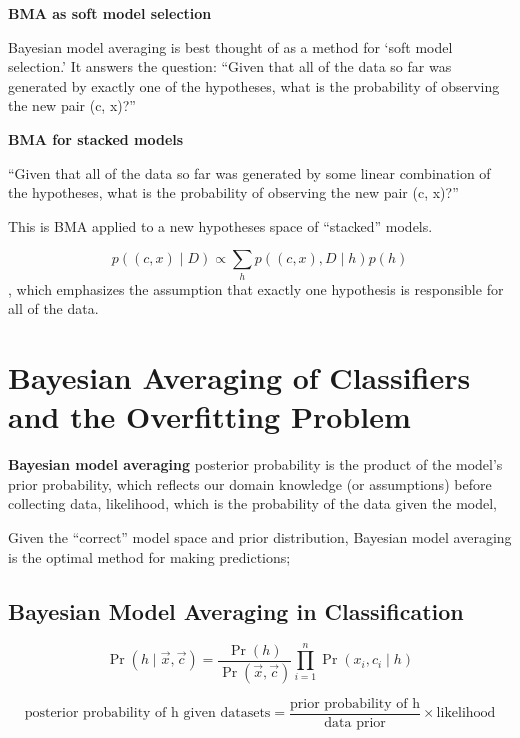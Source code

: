 \documentclass{article}
\begin{document}
\textbf{BMA as soft model selection}

Bayesian model averaging is best thought of as a method for ‘soft model selection.’ It answers the question: “Given that all of the data so far was generated by exactly one of the hypotheses, what is the probability of observing the new pair (c, x)?”

\textbf{BMA for stacked models}

“Given that all of the data so far was generated by some linear combination of the hypotheses, what is the probability of observing the new pair (c, x)?”

This is BMA applied to a new hypotheses space of “stacked” models. 

\begin{equation}
    p((c, x) \mid D) \propto \sum_{h} p((c, x), D \mid h) p(h)
\end{equation},
which emphasizes the assumption that exactly one hypothesis is responsible for all of the data.

\section{Bayesian Averaging of Classiﬁers and the Overﬁtting Problem\cite{domingos__BayesianAveragingClassifiers}}
\textbf{Bayesian model averaging}
posterior probability is the product of the model’s prior probability, which reﬂects our domain knowledge (or assumptions) before collecting data, likelihood, which is the probability of the data given the model,

Given the “correct” model space and prior distribution, Bayesian model averaging is the optimal method for making predictions; 

\subsection{Bayesian Model Averaging in Classiﬁcation}

\begin{equation}
    \operatorname{Pr}(h \mid \vec{x}, \vec{c})=\frac{\operatorname{Pr}(h)}{\operatorname{Pr}(\vec{x}, \vec{c})} \prod_{i=1}^{n} \operatorname{Pr}\left(x_{i}, c_{i} \mid h\right)
\end{equation}

\begin{equation}
    \text{posterior probability of h given datasets} = \frac{\text{prior probability of h} }{\text{data prior}}\times \text{likelihood}
\end{equation}
\end{document}
